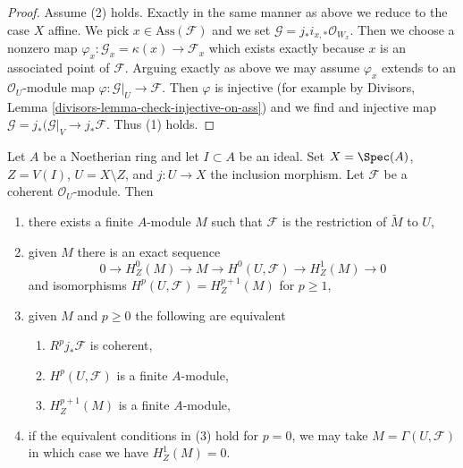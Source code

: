 \begin{proof}
\medskip\noindent
Assume (2) holds. Exactly in the same manner as above we reduce
to the case $X$ affine. We pick $x \in \text{Ass}(\mathcal{F})$
and we set $\mathcal{G} = j_*i_{x, *}\mathcal{O}_{W_x}$.
Then we choose a nonzero map
$\varphi_x : \mathcal{G}_x = \kappa(x) \to \mathcal{F}_x$
which exists exactly because $x$ is an associated point of $\mathcal{F}$.
Arguing exactly as above we may assume $\varphi_x$
extends to an $\mathcal{O}_U$-module map
$\varphi : \mathcal{G}|_U \to \mathcal{F}$.
Then $\varphi$ is injective (for example by
Divisors, Lemma \ref{divisors-lemma-check-injective-on-ass})
and we find and injective map
$\mathcal{G} = j_*(\mathcal{G}|_V \to j_*\mathcal{F}$.
Thus (1) holds.
\end{proof}

\begin{lemma}
\label{lemma-finiteness-pushforwards-and-H1-local}
Let $A$ be a Noetherian ring and let $I \subset A$ be an ideal.
Set $X = \Spec(A)$, $Z = V(I)$, $U = X \setminus Z$, and $j : U \to X$
the inclusion morphism. Let $\mathcal{F}$ be a coherent $\mathcal{O}_U$-module.
Then
\begin{enumerate}
\item there exists a finite $A$-module $M$ such that $\mathcal{F}$ is the
restriction of $\widetilde{M}$ to $U$,
\item given $M$ there is an exact sequence
$$
0 \to H^0_Z(M) \to M \to H^0(U, \mathcal{F}) \to H^1_Z(M) \to 0
$$
and isomorphisms $H^p(U, \mathcal{F}) = H^{p + 1}_Z(M)$ for $p \geq 1$,
\item given $M$ and $p \geq 0$ the following are equivalent
\begin{enumerate}
\item $R^pj_*\mathcal{F}$ is coherent,
\item $H^p(U, \mathcal{F})$ is a finite $A$-module,
\item $H^{p + 1}_Z(M)$ is a finite $A$-module,
\end{enumerate}
\item if the equivalent conditions in (3) hold for $p = 0$, we may take
$M = \Gamma(U, \mathcal{F})$ in which case we have $H^1_Z(M) = 0$.
\end{enumerate}
\end{lemma}

